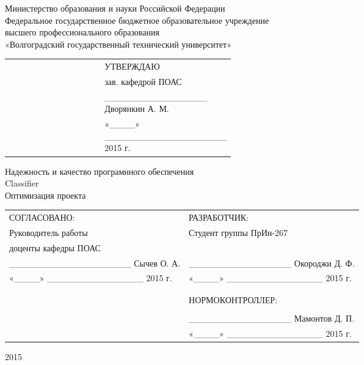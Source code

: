 \begin{titlepage}
	\newpage

	\begin{center}
        Министерство образования и науки Российской Федерации\\
        Федеральное государственное бюджетное образовательное учреждение\\
        высшего профессионального образования\\
        «Волгоградский государственный технический университет»
    \end{center}

	\vspace{2em} 

    \begin{tabular}{p{0.43\linewidth} l}
         & УТВЕРЖДАЮ \\
         & зав. кафедрой ПОАС \\
         & \_\_\_\_\_\_\_\_\_\_\_\_\_\_\_\_ Дворянкин А. М. \\
         & «\_\_\_\_» \_\_\_\_\_\_\_\_\_\_\_\_\_\_\_\_\_\_\_ 2015 г.
    \end{tabular}

    \vspace{4em}

    \begin{center}
        Надежность и качество програмнного обеспечения \\
        Classifier \\
        Оптимизация проекта
    \end{center}

    \vspace{4em}

    \begin{tabular}[t]{l l}
        СОГЛАСОВАНО: & РАЗРАБОТЧИК: \\
        Руководитель работы & Студент группы ПрИн-267 \\
        доценты кафедры ПОАС & \\
        \_\_\_\_\_\_\_\_\_\_\_\_\_\_\_\_\_\_\_ Сычев О. А. & \_\_\_\_\_\_\_\_\_\_\_\_\_\_\_\_ Окороджи Д. Ф. \\
        «\_\_\_\_» \_\_\_\_\_\_\_\_\_\_\_\_\_\_\_ 2015 г. & «\_\_\_\_» \_\_\_\_\_\_\_\_\_\_\_\_\_\_\_ 2015 г. \\
        \\
        \\
        & НОРМОКОНТРОЛЛЕР: \\
        & \\
        & \_\_\_\_\_\_\_\_\_\_\_\_\_\_\_\_ Мамонтов Д. П. \\
        & «\_\_\_\_» \_\_\_\_\_\_\_\_\_\_\_\_\_\_\_ 2015 г.
    \end{tabular}

    \vspace{3em}

	\begin{center} 2015 \end{center} 
\end{titlepage}
